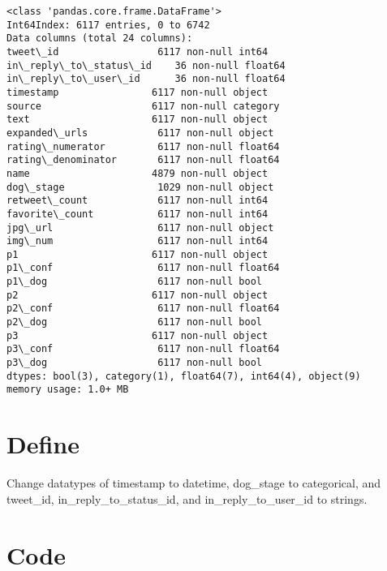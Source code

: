 \documentclass[11pt]{article}
\begin{document}
    \begin{Verbatim}[commandchars=\\\{\}]
<class 'pandas.core.frame.DataFrame'>
Int64Index: 6117 entries, 0 to 6742
Data columns (total 24 columns):
tweet\_id                 6117 non-null int64
in\_reply\_to\_status\_id    36 non-null float64
in\_reply\_to\_user\_id      36 non-null float64
timestamp                6117 non-null object
source                   6117 non-null category
text                     6117 non-null object
expanded\_urls            6117 non-null object
rating\_numerator         6117 non-null float64
rating\_denominator       6117 non-null float64
name                     4879 non-null object
dog\_stage                1029 non-null object
retweet\_count            6117 non-null int64
favorite\_count           6117 non-null int64
jpg\_url                  6117 non-null object
img\_num                  6117 non-null int64
p1                       6117 non-null object
p1\_conf                  6117 non-null float64
p1\_dog                   6117 non-null bool
p2                       6117 non-null object
p2\_conf                  6117 non-null float64
p2\_dog                   6117 non-null bool
p3                       6117 non-null object
p3\_conf                  6117 non-null float64
p3\_dog                   6117 non-null bool
dtypes: bool(3), category(1), float64(7), int64(4), object(9)
memory usage: 1.0+ MB

    \end{Verbatim}

    \hypertarget{define}{%
\section{Define}\label{define}}

    Change datatypes of timestamp to datetime, dog\_stage to categorical,
and tweet\_id, in\_reply\_to\_status\_id, and in\_reply\_to\_user\_id to
strings.

    \hypertarget{code}{%
\section{Code}\label{code}}
\end{document}
